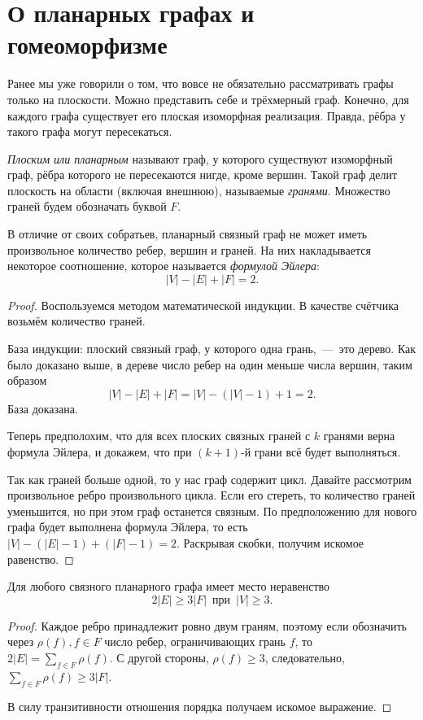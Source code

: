 \section{О планарных графах и гомеоморфизме}

	Ранее мы уже говорили о том, что вовсе не обязательно рассматривать графы только на плоскости. 
	Можно представить себе и трёхмерный граф. Конечно, для каждого графа существует его плоская изоморфная реализация. 
	Правда, рёбра у такого графа могут пересекаться.

\begin{definition}
	\emph{Плоским или планарным} называют граф, у которого существуют изоморфный граф, рёбра которого не пересекаются нигде, 
	кроме вершин. Такой граф делит плоскость на области (включая внешнюю), называемые \emph{гранями}. Множество граней будем 
	обозначать буквой $F$.
\end{definition}


	В отличие от своих собратьев, планарный связный граф не может иметь произвольное количество ребер, вершин и граней. 
	На них накладывается некоторое соотношение, которое называется \emph{формулой Эйлера}: $$|V| - |E| + |F| = 2.$$

\begin{proof}
	Воспользуемся методом математической индукции. В качестве счётчика возьмём количество граней.

	База индукции: плоский связный граф, у которого одна грань,~---~это дерево. Как было доказано выше, 
	в дереве число ребер на один меньше числа вершин, таким образом 
	$$|V| - |E| + |F| = |V| - (|V| - 1) + 1 = 2.$$
	База доказана.
	
	Теперь предполохим, что для всех плоских связных граней с $k$ гранями верна формула Эйлера, и докажем, 
	что при $(k+1)$-й грани всё будет выполняться.
	
	Так как граней больше одной, то у нас граф содержит цикл. Давайте рассмотрим произвольное ребро произвольного цикла. 
	Если его стереть, то количество граней уменьшится, но при этом граф останется связным. 
	По предположению для нового графа будет выполнена формула Эйлера, то есть $|V| - (|E| - 1) + (|F| - 1) = 2$. 
	Раскрывая скобки, получим искомое равенство.
\end{proof}

\begin{statement}
	Для любого связного планарного графа имеет место неравенство
	$$2|E| \geqslant 3|F| \;\ \text{при} \;\ |V| \geqslant 3.$$
\begin{proof}
	Каждое ребро принадлежит ровно двум граням, поэтому если обозначить через $\rho(f), f \in F$ число ребер,
	ограничивающих грань $f$, то $2|E| = \displaystyle\sum_{f \in F} \rho(f)$. С другой стороны, $\rho(f) \geqslant 3$, 
	следовательно, $\displaystyle\sum_{f \in F} \rho(f) \geqslant 3|F|$.
	
	В силу транзитивности отношения порядка получаем искомое выражение.
\end{proof}
\end{statement}

